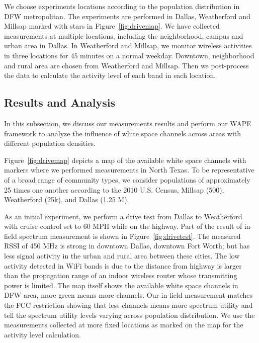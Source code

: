 We choose experiments locations according to the population distribution in DFW metropolitan. 
The experiments are performed in Dallas, Weatherford and Millsap marked with stars in 
Figure~\ref{fig:drivemap}.
We have collected measurements at multiple locations, including the neighborhood, campus and 
urban area in Dallas.
In Weatherford and Millsap, we monitor wireless activities in three locations for 45 minutes
on a normal weekday. 
Downtown, neighborhood and rural area are chosen from Weatherford and Millsap. 
Then we post-process the data to calculate the activity level of each band in each location.


\subsection{Results and Analysis} 
\label{subsec:result}
In this subsection, we discuss our measurements results and perform our WAPE framework 
to analyze the influence of white space channels across areas with different population densities.

Figure~\ref{fig:drivemap} depicts a map of the available white space channels with
markers where we performed measurements in North Texas. To be representative of a broad range of 
community types, we consider populations of approximately 25 times one another according to the
2010 U.S. Census, Millsap (500), Weatherford (25k), and Dallas (1.25 M). 

As an initial experiment, 
we perform a drive test from Dallas to Weatherford with cruise control set to 60 MPH while on
the highway.  
Part of the result of in-field spectrum measurement is shown in Figure~\ref{fig:drivetest}.
The measured RSSI of 450 MHz is strong in downtown Dallas, downtown Fort Worth;
but has less signal activity in the urban and rural area between these cities.
The low activity detected in WiFi bands is due to the distance from highway is larger
than the propagation range of an indoor wireless router whose transmitting power is limited.
The map itself shows the available white space channels in DFW area, more green means
more channels. Our in-field measurement matches the FCC restriction showing that less channels means
more spectrum utility and tell the spectrum utility levels varying across population 
distribution. We use the measurements collected at more fixed locations as marked on the map for
the activity level calculation. 

